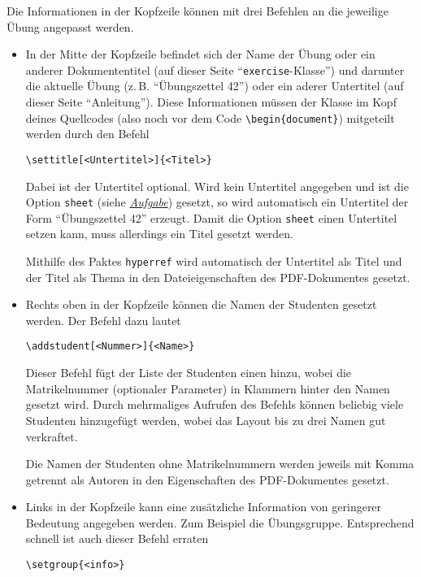 \documentclass{exercise}
\begin{document}
  \label{section-kopfzeile}
    Die Informationen in der Kopfzeile können mit drei Befehlen an die
    jeweilige Übung angepasst werden.
    \begin{itemize}
      \item In der Mitte der Kopfzeile befindet sich der Name der Übung oder
      ein anderer Dokumententitel (auf dieser Seite
      \enquote{\texttt{exercise}-Klasse}) und darunter die aktuelle Übung
      (z.\,B. \enquote{Übungszettel 42}) oder ein aderer Untertitel (auf dieser
      Seite \enquote{Anleitung}). Diese Informationen müssen der Klasse im Kopf
      deines Quellcodes (also noch vor dem Code \lstinline-\begin{document}-) mitgeteilt
      werden durch den Befehl
        \begin{lstlisting}[gobble=10]
          \settitle[<Untertitel>]{<Titel>}  
        \end{lstlisting}
        
        Dabei ist der Untertitel optional. Wird kein Untertitel angegeben und
        ist die Option \lstinline{sheet} (siehe
        \hyperref[section-aufgaben]{\emph{Aufgabe}}) gesetzt, so wird
        automatisch ein Untertitel der Form \enquote{Übungszettel 42} erzeugt.
        Damit die Option \lstinline{sheet} einen Untertitel setzen kann, muss
        allerdings ein Titel gesetzt werden.
        
        Mithilfe des Paktes \texttt{hyperref} \cite{hyperref} wird automatisch der Untertitel als Titel und der Titel als Thema in den Dateieigenschaften des PDF-Dokumentes gesetzt. 
        
      \item Rechts oben in der Kopfzeile können die Namen der Studenten gesetzt werden. Der Befehl dazu lautet
      \begin{lstlisting}[gobble=8]
        \addstudent[<Nummer>]{<Name>} 
      \end{lstlisting}
      Dieser Befehl fügt der Liste der Studenten einen hinzu, wobei die Matrikelnummer (optionaler Parameter) in Klammern hinter den Namen gesetzt wird. Durch mehrmaliges Aufrufen des Befehls können beliebig viele Studenten hinzugefügt werden, wobei das Layout bis zu drei Namen gut verkraftet.
      
      Die Namen der Studenten ohne Matrikelnummern werden jeweils mit Komma getrennt als Autoren in den Eigenschaften des PDF-Dokumentes gesetzt.
        
      \item Links in der Kopfzeile kann eine zusätzliche Information von geringerer Bedeutung angegeben werden. Zum Beispiel die Übungsgruppe. Entsprechend schnell ist auch dieser Befehl erraten
        \begin{lstlisting}[gobble=10]
          \setgroup{<info>}
        \end{lstlisting}
    \end{itemize}
    
\end{document}
